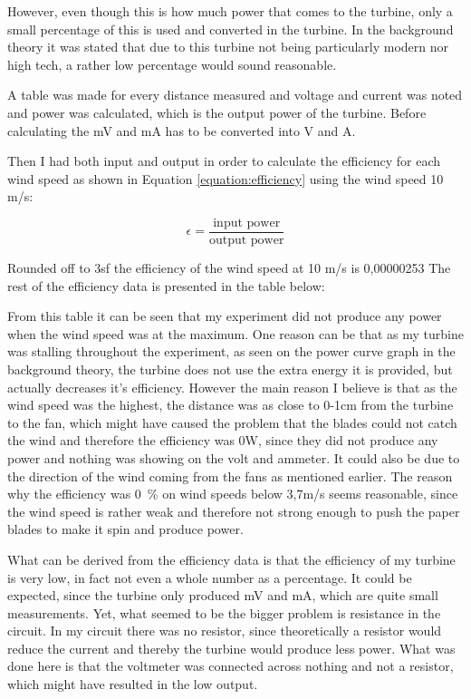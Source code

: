 \documentclass[12pt]{article}
\begin{document}
However, even though this is how much power that comes to the turbine, only a small percentage of this is used and converted in the turbine.
In the background theory it was stated that due to this turbine not being particularly modern nor high tech, a rather low percentage would sound reasonable.

A table was made for every distance measured and voltage and current was noted and power was calculated, which is the output power of the turbine.
Before calculating the mV and mA has to be converted into V and A.

Then I had both input and output in order to calculate the efficiency for each wind speed as shown in Equation \ref{equation:efficiency} using the wind speed 10 m/s:

\begin{equation}
  \epsilon = \frac{\text{input power}}{\text{output power}}
  \label{equation:efficiency}
\end{equation}

%
Rounded off to 3sf the efficiency of the wind speed at 10 m/s is 0,00000253%
The rest of the efficiency data is presented in the table below:

\begin{table}
\end{table}

From this table it can be seen that my experiment did not produce any power when the wind speed was at the maximum.
One reason can be that as my turbine was stalling throughout the experiment, as seen on the power curve graph in the background theory, the turbine does not use the extra energy it is provided, but actually decreases it's efficiency.
However the main reason I believe is that as the wind speed was the highest, the distance was as close to 0-1cm from the turbine to the fan, which might have caused the problem that the blades could not catch the wind and therefore the efficiency was 0W, since they did not produce any power and nothing was showing on the volt and ammeter.
It could also be due to the direction of the wind coming from the fans as mentioned earlier.
The reason why the efficiency was \SI{0}{\percent} on wind speeds below 3,7m/s seems reasonable, since the wind speed is rather weak and therefore not strong enough to push the paper blades to make it spin and produce power.


What can be derived from the efficiency data is that the efficiency of my turbine is very low, in fact not even a whole number as a percentage.
It could be expected, since the turbine only produced mV and mA, which are quite small measurements.
Yet, what seemed to be the bigger problem is resistance in the circuit.
In my circuit there was no resistor, since theoretically a resistor would reduce the current and thereby the turbine would produce less power.
What was done here is that the voltmeter was connected across nothing and not a resistor, which might have resulted in the low output.
\end{document}
